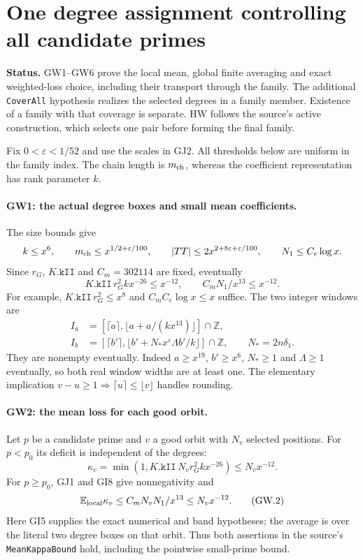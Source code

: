 \documentclass[11pt,a4paper]{article}
\numberwithin{equation}{section}
\theoremstyle{remark}\newtheorem{remark}[theorem]{Remark}
\begin{document}
\section{One degree assignment controlling all candidate primes}
\label{sec:global-weight-choice}

\noindent\textbf{Status.}
GW1--GW6 prove the local mean, global finite averaging and exact
weighted-loss choice, including their transport through the family.
The additional \texttt{CoverAll} hypothesis
realizes the selected degrees in a family member. Existence of a
family with that coverage is separate. HW follows the source's active
construction, which selects one pair before forming the final family.

Fix $0<\varepsilon<1/52$ and use the scales in GJ2. All thresholds
below are uniform in the family index. The chain length is $m_{\rm ch}$,
whereas the coefficient representation has rank parameter $k$.

\paragraph{GW1: the actual degree boxes and small mean coefficients.}
The size bounds give
\[
 k\le x^6,\qquad m_{\rm ch}\le x^{1/2+\varepsilon/100},\qquad
 |TT|\le2x^{2+8\varepsilon+\varepsilon/100},\qquad
 N_1\le C_e\log x.
\]
Since $r_G$, $K.\texttt{kII}$ and $C_m=302114$ are fixed, eventually
\[
 K.\texttt{kII}\,r_G^2 kx^{-26}\le x^{-12},\qquad
 C_mN_1/x^{13}\le x^{-12}.                         \tag{GW.1}
\]
For example, $K.\texttt{kII}\,r_G^2\le x^8$ and
$C_m C_e\log x\le x$ suffice. The two integer windows are
\begin{align*}
 I_a&=[\lceil a\rceil,\lfloor a+a/(kx^{13})\rfloor]\cap\mathbb Z,\\
 I_b&=[\lceil b'\rceil,
       \lfloor b'+N_*x^\varepsilon\Lambda b'/k\rfloor]\cap\mathbb Z,
 \qquad N_*=2n\delta_1.
\end{align*}
They are nonempty eventually. Indeed $a\ge x^{19}$,
$b'\ge x^6$, $N_*\ge1$ and $\Lambda\ge1$ eventually, so both real
window widths are at least one. The elementary implication
$v-u\ge1\Rightarrow\lceil u\rceil\le\lfloor v\rfloor$ handles rounding.

\paragraph{GW2: the mean loss for each good orbit.}
Let $p$ be a candidate prime and $v$ a good orbit with $N_v$ selected
positions. For $p<p_0$ its deficit is independent of the degrees:
\[
 \kappa_v=\min(1,K.\texttt{kII}\,N_vr_G^2kx^{-26})
 \le N_vx^{-12}.
\]
For $p\ge p_0$, GJ1 and GI8 give nonnegativity and
\[
 \mathbb E_{\rm local}\kappa_v
 \le C_mN_vN_1/x^{13}\le N_vx^{-12}.                 \tag{GW.2}
\]
Here GI5 supplies the exact numerical and band hypotheses; the
average is over the literal two degree boxes on that orbit. Thus
both assertions in the source's \texttt{MeanKappaBound} hold, including
the pointwise small-prime bound.
\end{document}
